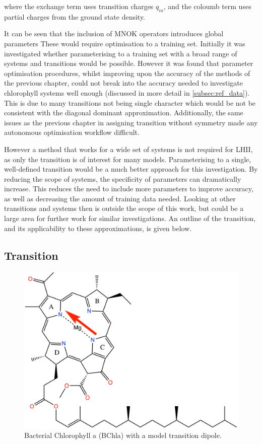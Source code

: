 where the exchange term uses transition charges $q_{ia}$, and the coloumb term uses
partial charges from the ground state density.

It can be seen that the inclusion of MNOK operators introduces global parameters
These would require optimisation to a training set. Initially it was investigated
whether parameterising to a training set with a broad range of systems and transitions
would be possible. However it was found that parameter optimisation procedures, 
whilst improving upon the accuracy of the \dxtb methods of the previous chapter,
could not break into the accuracy needed to investigate chlorophyll systems well
enough (discussed in more detail in \ref{subsec:ref_data}). This is due to many
transitions not being single character which would be not be consistent with the
diagonal dominant approximation. Additionally, the same issues as the previous 
chapter in assigning transition without symmetry made any autonomous optimisation
workflow difficult.

However a method that works for a wide set of systems is not required for LHII,
as only the \Qy transition is of interest for many models. Parameterising to a 
single, well-defined transition would be a much better approach for this investigation.
By reducing the scope of systems, the specificity of parameters can dramatically increase. 
This reduces the need to include more parameters to improve accuracy, as well as 
decreasing the amount of training data needed. Looking at other transitions and
systems then is outside the scope of this work, but could be a large area for further
work for similar investigations. An outline of the \Qy transition, and its applicability
to these approximations, is given below.

\subsection{\Qy Transition}
\label{subsec:qy_transition}
\begin{figure}
    \centering
    \includegraphics{chapters/chapter03/chlorophyll_Qy.png}
    \caption{Bacterial Chlorophyll a (BChla) with a model \Qy transition dipole.}
    \label{fig:bchla_qy}
\end{figure}

